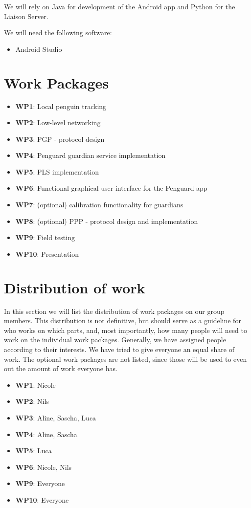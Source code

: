 \documentclass{report}
\begin{document}
We will rely on Java for development of the Android app and Python for the Liaison Server.

We will need the following software:

\begin{itemize}
    \item Android Studio
\end{itemize}


\section{Work Packages}

\begin{itemize}
        \item {\bf WP1}: Local penguin tracking
        \item {\bf WP2}: Low-level networking
        \item {\bf WP3}: PGP - protocol design
        \item {\bf WP4}: Penguard guardian service implementation
        \item {\bf WP5}: PLS implementation
        \item {\bf WP6}: Functional graphical user interface for the Penguard app
        \item {\bf WP7}: (optional) calibration functionality for guardians
        \item {\bf WP8}: (optional) PPP - protocol design and implementation
        \item {\bf WP9}: Field testing
        \item {\bf WP10}: Presentation
\end{itemize}

\section{Distribution of work}

In this section we will list the distribution of work packages on our group members. This distribution is not definitive, but should serve as a guideline for who works on which parts, and, most importantly, how many people will need to work on the individual work packages. Generally, we have assigned people according to their interests. We have tried to give everyone an equal share of work. The optional work packages are not listed, since those will be used to even out the amount of work everyone has.

\begin{itemize}
	\item \textbf{WP1}: Nicole
	\item \textbf{WP2}: Nils
	\item \textbf{WP3}: Aline, Sascha, Luca
	\item \textbf{WP4}: Aline, Sascha
	\item \textbf{WP5}: Luca
	\item \textbf{WP6}: Nicole, Nils
	\item \textbf{WP9}: Everyone
	\item \textbf{WP10}: Everyone
\end{itemize}
\end{document}
